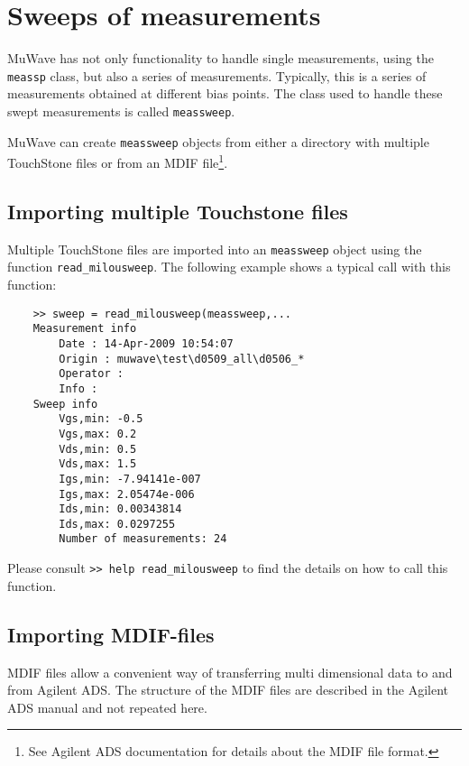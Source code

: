 %
%

\section{Sweeps of measurements}\label{sec:sweeps}
MuWave has not only functionality to handle single measurements,
using the \verb"meassp" class, but also a series of measurements.
Typically, this is a series of measurements obtained at different
bias points. The class used to handle these swept measurements is
called \verb"meassweep".

MuWave can create \verb"meassweep" objects from either a directory
with multiple TouchStone files or from an MDIF file\footnote{See
Agilent ADS documentation for details about the MDIF file
format.}.

\subsection{Importing multiple Touchstone files}
Multiple TouchStone files are imported into an \verb"meassweep"
object using the function \verb"read_milousweep". The following
example shows a typical call with this function:
\begin{small}
\begin{verbatim}
    >> sweep = read_milousweep(meassweep,...
    Measurement info
        Date : 14-Apr-2009 10:54:07
        Origin : muwave\test\d0509_all\d0506_*
        Operator :
        Info :
    Sweep info
    	Vgs,min: -0.5
    	Vgs,max: 0.2
    	Vds,min: 0.5
    	Vds,max: 1.5
    	Igs,min: -7.94141e-007
    	Igs,max: 2.05474e-006
    	Ids,min: 0.00343814
    	Ids,max: 0.0297255
    	Number of measurements: 24
\end{verbatim}
\end{small}
Please consult \verb">> help read_milousweep" to find the details
on how to call this function.

\subsection{Importing MDIF-files}
MDIF files allow a convenient way of transferring multi
dimensional data to and from Agilent ADS. The structure of the
MDIF files are described in the Agilent ADS manual and not
repeated here.

